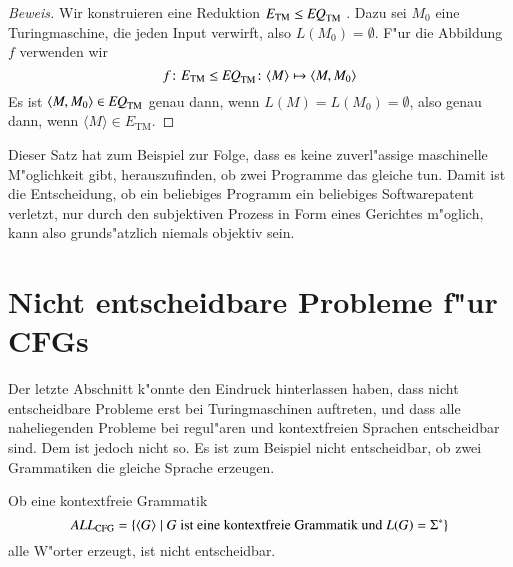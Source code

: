 \begin{proof}[Beweis]
Wir konstruieren eine Reduktion
$
E_{\text{TM}}\le \text{\it EQ}_{\text{TM}}
$
.
Dazu sei $M_0$ eine Turingmaschine, die jeden Input verwirft,
also $L(M_0)=\emptyset$.
F"ur die Abbildung $f$ verwenden wir
\[
f
\colon
E_{\text{TM}}\le \text{\it EQ}_{\text{TM}}
\colon
\langle M\rangle\mapsto \langle M,M_0\rangle
\]
Es ist $\langle M,M_0\rangle\in \text{\it EQ}_{\text{TM}}$
genau dann, wenn
$L(M)=L(M_0)=\emptyset$, also genau dann, wenn
$\langle M\rangle\in E_{\text{TM}}$.
\end{proof}

Dieser Satz hat zum Beispiel zur Folge, dass es keine zuverl"assige
maschinelle
M"oglichkeit gibt, herauszufinden, ob zwei Programme das gleiche tun.
Damit ist die Entscheidung, ob ein beliebiges Programm ein beliebiges
Softwarepatent verletzt, nur durch den subjektiven Prozess in Form
eines Gerichtes m"oglich, kann also grunds"atzlich niemals objektiv sein.

\section{Nicht entscheidbare Probleme f"ur CFGs}
Der letzte Abschnitt k"onnte den Eindruck hinterlassen haben,
dass nicht entscheidbare Probleme erst bei Turingmaschinen
auftreten, und dass alle naheliegenden Probleme bei regul"aren
und kontextfreien Sprachen entscheidbar sind.
Dem ist jedoch nicht so.
Es ist zum Beispiel nicht entscheidbar, ob zwei
Grammatiken die gleiche Sprache erzeugen.

\begin{satz} Ob eine kontextfreie Grammatik
\[
\text{\it ALL}_{\text{CFG}}=\{\langle G\rangle\;|\; \text{$G$
ist eine kontextfreie Grammatik und $L(G)=\Sigma^*$}\}
\]
%
alle W"orter erzeugt, ist nicht entscheidbar.
\end{satz}

